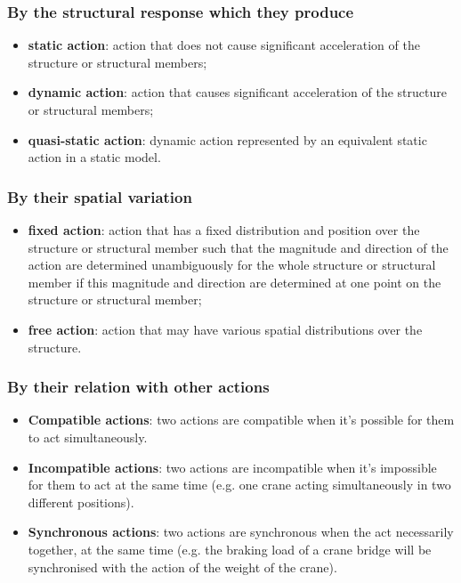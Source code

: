 \subsubsection{By the structural response which they produce} 
\begin{itemize}
\item \textbf{static action}: action that does not cause significant acceleration of the structure or structural members;
\item \textbf{dynamic action}:  action that causes significant acceleration of the structure or structural members;
\item \textbf{quasi-static action}: dynamic action represented by an equivalent static action in a static model.
\end{itemize}


\subsubsection{By their spatial variation}
\begin{itemize}
\item \textbf{fixed action}: action that has a fixed distribution and position over the structure or structural member such that the magnitude and direction of the action are determined unambiguously for the whole structure or structural member if this magnitude and direction are determined at one point on the structure or structural member;
\item \textbf{free action}: action that may have various spatial distributions over the structure.
\end{itemize}

\subsubsection{By their relation with other actions} \label{sc_acc_rel_otras}
\begin{itemize}
\item \textbf{Compatible actions}: two actions are compatible when it's possible for them to act simultaneously.
\item \textbf{Incompatible actions}: two actions are incompatible when it's impossible for them to act at the same time (e.g. one crane acting simultaneously in two different positions).
\item \textbf{Synchronous actions}: two actions are synchronous when the act necessarily together, at the same time (e.g. the braking load of a crane bridge will be synchronised with the action of the weight of the crane).
\end{itemize}


